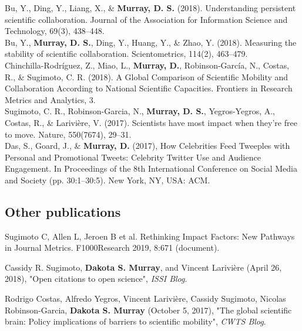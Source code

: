\documentclass[10pt, a4paper]{article}
\newcommand{\years}[1]{\marginnote{\scriptsize #1}}
\begin{document}
\years{2018} \hangindent=0.7cm Bu, Y., Ding, Y., Liang, X., \& \textbf{Murray, D. S. }(2018). Understanding persistent scientific collaboration. Journal of the Association for Information Science and Technology, 69(3), 438–448. \\

\years{2018} \hangindent=0.7cm Bu, Y., \textbf{Murray, D. S.}, Ding, Y., Huang, Y., \& Zhao, Y. (2018). Measuring the stability of scientific collaboration. Scientometrics, 114(2), 463–479. \\

\years{2018} \hangindent=0.7cm Chinchilla-Rodríguez, Z., Miao, L., \textbf{Murray, D.}, Robinson-García, N., Costas, R., \& Sugimoto, C. R. (2018). A Global Comparison of Scientific Mobility and Collaboration According to National Scientific Capacities. Frontiers in Research Metrics and Analytics, 3. \\

\years{2017} \hangindent=0.7cm Sugimoto, C. R., Robinson-Garcia, N., \textbf{Murray, D. S.}, Yegros-Yegros, A., Costas, R., \& Larivière, V. (2017). Scientists have most impact when they’re free to move. Nature, 550(7674), 29–31. \\

\years{2017} \hangindent=0.7cm Das, S., Goard, J., \& \textbf{Murray, D.} (2017), How Celebrities Feed Tweeples with Personal and Promotional Tweets: Celebrity Twitter Use and Audience Engagement. In Proceedings of the 8th International Conference on Social Media and Society (pp. 30:1–30:5). New York, NY, USA: ACM. 

\subsection*{Other publications}
\noindent

\years{2019} \hangindent=0.7cm Sugimoto C, Allen L, Jeroen B et al. Rethinking Impact Factors: New Pathways in Journal Metrics. F1000Research 2019, 8:671 (document). 

\years{2018} \hangindent=0.7cm Cassidy R. Sugimoto, \textbf{Dakota S. Murray}, and Vincent Larivière (April 26, 2018), "Open citations to open science", \emph{ISSI Blog}. 

\years{2017} \hangindent=0.7cm Rodrigo Costas, Alfredo Yegros, Vincent Larivière, Cassidy Sugimoto, Nicolas Robinson-Garcia, \textbf{Dakota S. Murray} (October 5, 2017), "The global scientific brain: Policy implications of barriers to scientific mobility", \emph{CWTS Blog}. 
\end{document}
